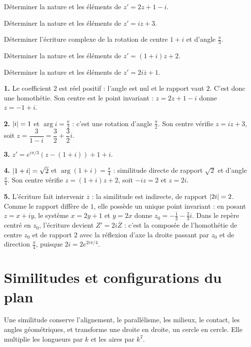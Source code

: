 \begin{entrainement}
\exo[\niveau{1}] Déterminer la nature et les éléments de $z' = 2z+1-i$.

\exo[\niveau{1}] Déterminer la nature et les éléments de $z' = iz+3$.

\exo[\niveau{2}] Déterminer l'écriture complexe de la rotation de centre
$1+i$ et d'angle $\frac{\pi}{3}$.

\exo[\niveau{2}] Déterminer la nature et les éléments de
$z' = (1+i)z+2$.

\exo[\niveau{3}] Déterminer la nature et les éléments de
$z' = 2i\overline z+1$.
\end{entrainement}

\begin{corrige}
\textbf{1.} Le coefficient $2$ est réel positif : l'angle est nul et le
rapport vaut $2$. C'est donc une homothétie. Son centre est le point
invariant : $z = 2z+1-i$ donne $z = -1+i$.

\textbf{2.} $\left|i\right| = 1$ et $\arg i = \frac{\pi}{2}$ : c'est une rotation
d'angle $\frac{\pi}{2}$. Son centre vérifie $z = iz+3$, soit
$z = \dfrac{3}{1-i} = \dfrac32+\dfrac32 i$.

\textbf{3.} $z' = e^{i\pi/3}\left(z-(1+i)\right)+1+i$.

\textbf{4.} $\left|1+i\right| = \sqrt2$ et $\arg(1+i) = \frac{\pi}{4}$ : similitude
directe de rapport $\sqrt2$ et d'angle $\frac{\pi}{4}$. Son centre vérifie
$z = (1+i)z+2$, soit $-iz = 2$ et $z = 2i$.

\textbf{5.} L'écriture fait intervenir $\overline z$ : la similitude est
indirecte, de rapport $\left|2i\right| = 2$. Comme le rapport diffère de $1$, elle
possède un unique point invariant : en posant $z = x+iy$, le système
$x = 2y+1$ et $y = 2x$ donne $z_{0} = -\frac13-\frac23 i$. Dans le repère
centré en $z_{0}$, l'écriture devient $Z' = 2i\overline Z$ : c'est la composée
de l'homothétie de centre $z_{0}$ et de rapport $2$ avec la réflexion d'axe la
droite passant par $z_{0}$ et de direction $\frac{\pi}{4}$, puisque
$2i = 2e^{2i\pi/4}$.
\end{corrige}

\section{Similitudes et configurations du plan}

\begin{propriete}
Une similitude conserve l'alignement, le parallélisme, les milieux, le
contact, les angles géométriques, et transforme une droite en droite, un
cercle en cercle. Elle multiplie les longueurs par $k$ et les aires par
$k^{2}$.
\end{propriete}

